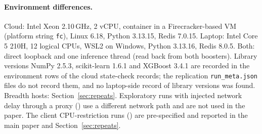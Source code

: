 \documentclass[10pt,a4paper]{article}
\begin{document}
\paragraph{Environment differences.} Cloud: Intel Xeon 2.10\,GHz, 2 vCPU, container in a Firecracker-based VM (platform string \texttt{fc}), Linux 6.18, Python 3.13.15, Redis 7.0.15. Laptop: Intel Core 5 210H, 12 logical CPUs, WSL2 on Windows, Python 3.13.16, Redis 8.0.5. Both: direct loopback and one inference thread (read back from both boosters). Library versions NumPy 2.5.3, scikit-learn 1.6.1 and XGBoost 3.4.1 are recorded in the environment rows of the cloud state-check records; the replication \texttt{run\_meta.json} files do not record them, and no laptop-side record of library versions was found. Breadth hosts: Section~\ref{sec:repeats}. Exploratory runs with injected network delay through a proxy () use a different network path and are not used in the paper. The client CPU-restriction runs () are pre-specified and reported in the main paper and Section~\ref{sec:repeats}.
\end{document}
